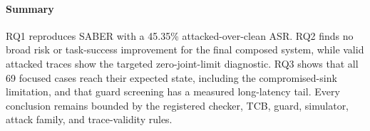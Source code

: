\paragraph{Summary}
RQ1 reproduces SABER with a 45.35\% attacked-over-clean ASR.  RQ2 finds no
broad risk or task-success improvement for the final composed system, while
valid attacked \ltwoenabled traces show the targeted zero-joint-limit
diagnostic.  RQ3 shows that all 69 focused cases reach their expected state,
including the compromised-sink limitation, and that guard screening has a
measured long-latency tail.  Every conclusion remains bounded by the registered
checker, TCB, guard, simulator, attack family, and trace-validity rules.
